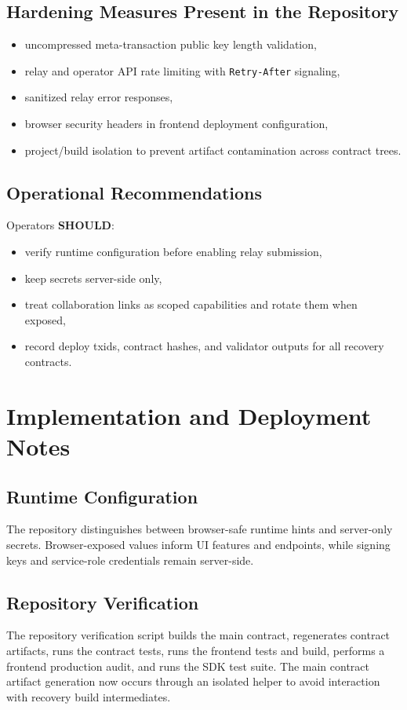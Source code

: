 \documentclass[11pt]{article}
\newcommand{\code}[1]{\texttt{#1}}
\newcommand{\should}{\textbf{SHOULD}}
\begin{document}
\subsection{Hardening Measures Present in the Repository}
\begin{itemize}
  \item uncompressed meta-transaction public key length validation,
  \item relay and operator API rate limiting with \code{Retry-After} signaling,
  \item sanitized relay error responses,
  \item browser security headers in frontend deployment configuration,
  \item project/build isolation to prevent artifact contamination across contract trees.
\end{itemize}

\subsection{Operational Recommendations}
Operators \should{}:
\begin{itemize}
  \item verify runtime configuration before enabling relay submission,
  \item keep secrets server-side only,
  \item treat collaboration links as scoped capabilities and rotate them when exposed,
  \item record deploy txids, contract hashes, and validator outputs for all recovery contracts.
\end{itemize}

\section{Implementation and Deployment Notes}
\subsection{Runtime Configuration}
The repository distinguishes between browser-safe runtime hints and server-only secrets. Browser-exposed values inform UI features and endpoints, while signing keys and service-role credentials remain server-side.

\subsection{Repository Verification}
The repository verification script builds the main contract, regenerates contract artifacts, runs the contract tests, runs the frontend tests and build, performs a frontend production audit, and runs the SDK test suite. The main contract artifact generation now occurs through an isolated helper to avoid interaction with recovery build intermediates.
\end{document}
